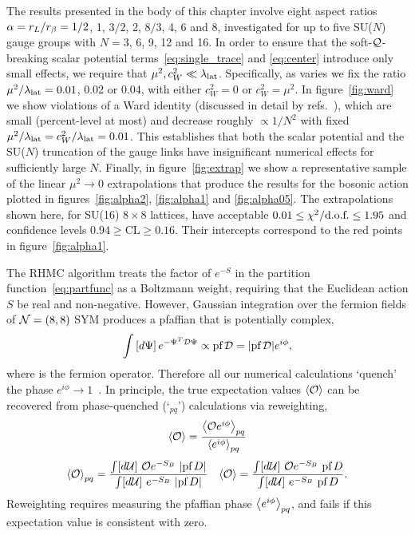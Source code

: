 The results presented in the body of this chapter  involve eight aspect ratios $\alpha = r_L / r_{\beta} = 1 / 2$, 1, $3 / 2$, 2, $8 / 3$, 4, 6 and 8, investigated for up to five SU($N$) gauge groups with $N = 3$, 6, 9, 12 and 16.
In order to ensure that the soft-$\mathcal Q$-breaking scalar potential terms~\eqref{eq:single_trace} and \eqref{eq:center} introduce only small effects, we require that $\mu^2, c_W^2 \ll \lambda_{\text{lat}}$.
Specifically, as \lalat varies we fix the ratio $\mu^2 / \lambda_{\text{lat}} = 0.01$, 0.02 or 0.04, with either $c_W^2 = 0$ or $c_W^2 = \mu^2$.
In figure~\ref{fig:ward} we show violations of a \cQ Ward identity (discussed in detail by refs.~\cite{Catterall:2014vka, Schaich:2015ppr}), which are small (percent-level at most) and decrease roughly $\propto 1 / N^2$ with fixed $\mu^2 / \lambda_{\text{lat}} = c_W^2 / \lambda_{\text{lat}} = 0.01$.
This establishes that both the scalar potential and the SU($N$) truncation of the gauge links have insignificant numerical effects for sufficiently large $N$.
Finally, in figure~\ref{fig:extrap} we show a representative sample of the linear $\mu^2 \to 0$ extrapolations that produce the results for the bosonic action plotted in figures~\ref{fig:alpha2}, \ref{fig:alpha1} and \ref{fig:alpha05}.
The extrapolations shown here, for SU(16) $8\times 8$ lattices, have acceptable $0.01 \leq \mbox{$\chi^2/\text{d.o.f.}$} \leq 1.95$ and confidence levels $0.94 \geq \text{CL} \geq 0.16$.
Their intercepts correspond to the red points in figure~\ref{fig:alpha1}.

The RHMC algorithm treats the factor of $e^{-S}$ in the partition function~\eqref{eq:partfunc} as a Boltzmann weight, requiring that the Euclidean action $S$ be real and non-negative.
However, Gaussian integration over the fermion fields of $\mathcal N = (8, 8)$ SYM produces a pfaffian that is potentially complex,
\begin{equation}
  \int \left[d\Psi\right] e^{-\Psi^T \mathcal D \Psi} \propto \text{pf}\, \mathcal D = |\text{pf}\, \mathcal D| e^{i\phi},
\end{equation}
where \cD is the fermion operator.
Therefore all our numerical calculations `quench' the phase $e^{i\phi} \to 1$~\cite{Schaich:2014pda}.
In principle, the true expectation values $\left\langle \mathcal O \right\rangle$ can be recovered from phase-quenched (`$_{pq}$') calculations via reweighting,
\begin{equation}
  \left\langle \mathcal O \right\rangle = \frac{\left\langle \mathcal O e^{i\phi} \right\rangle_{pq}}{\left\langle e^{i\phi} \right\rangle_{pq}}
\end{equation}
\begin{align}
  \vev{\cO}_{pq} & = \frac{\int[d\cU] \ \cO e^{-S_B}\ |\pf D|}{\int[d\cU] \ e^{-S_B} \ |\pf D|} &
  \vev{\cO} = \frac{\int[d\cU] \ \cO e^{-S_B}\ \pf D}{\int[d\cU] \ e^{-S_B} \ \pf D}.
\end{align}
Reweighting requires measuring the pfaffian phase $\left\langle e^{i\phi} \right\rangle_{pq}$, and fails if this expectation value is consistent with zero.

